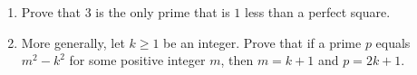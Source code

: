 \begin{enumerate}
\item[(a)] Prove that $3$ is the only prime that is $1$ less than a perfect square.
\item[(b)] More generally, let $k\ge1$ be an integer. Prove that if a prime $p$ equals $m^2-k^2$ for some positive integer $m$, then $m=k+1$ and $p=2k+1$.
\end{enumerate}

